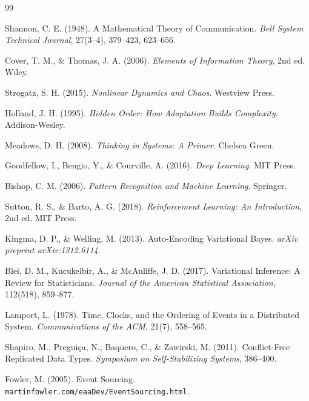 \documentclass[11pt, a4paper]{article}
\theoremstyle{named}
\begin{document}
\begin{thebibliography}{99}

Shannon, C. E. (1948).
A Mathematical Theory of Communication.
\textit{Bell System Technical Journal}, 27(3--4), 379--423, 623--656.

Cover, T. M., \& Thomas, J. A. (2006).
\textit{Elements of Information Theory}, 2nd ed.
Wiley.

Strogatz, S. H. (2015).
\textit{Nonlinear Dynamics and Chaos}.
Westview Press.

Holland, J. H. (1995).
\textit{Hidden Order: How Adaptation Builds Complexity}.
Addison-Wesley.

Meadows, D. H. (2008).
\textit{Thinking in Systems: A Primer}.
Chelsea Green.

Goodfellow, I., Bengio, Y., \& Courville, A. (2016).
\textit{Deep Learning}.
MIT Press.

Bishop, C. M. (2006).
\textit{Pattern Recognition and Machine Learning}.
Springer.

Sutton, R. S., \& Barto, A. G. (2018).
\textit{Reinforcement Learning: An Introduction}, 2nd ed.
MIT Press.

Kingma, D. P., \& Welling, M. (2013).
Auto-Encoding Variational Bayes.
\textit{arXiv preprint arXiv:1312.6114}.

Blei, D. M., Kucukelbir, A., \& McAuliffe, J. D. (2017).
Variational Inference: A Review for Statisticians.
\textit{Journal of the American Statistical Association}, 112(518), 859--877.

Lamport, L. (1978).
Time, Clocks, and the Ordering of Events in a Distributed System.
\textit{Communications of the ACM}, 21(7), 558--565.

Shapiro, M., Preguiça, N., Baquero, C., \& Zawirski, M. (2011).
Conflict-Free Replicated Data Types.
\textit{Symposium on Self-Stabilizing Systems}, 386--400.

Fowler, M. (2005).
Event Sourcing.
\texttt{martinfowler.com/eaaDev/EventSourcing.html}.


\end{thebibliography}
\end{document}
